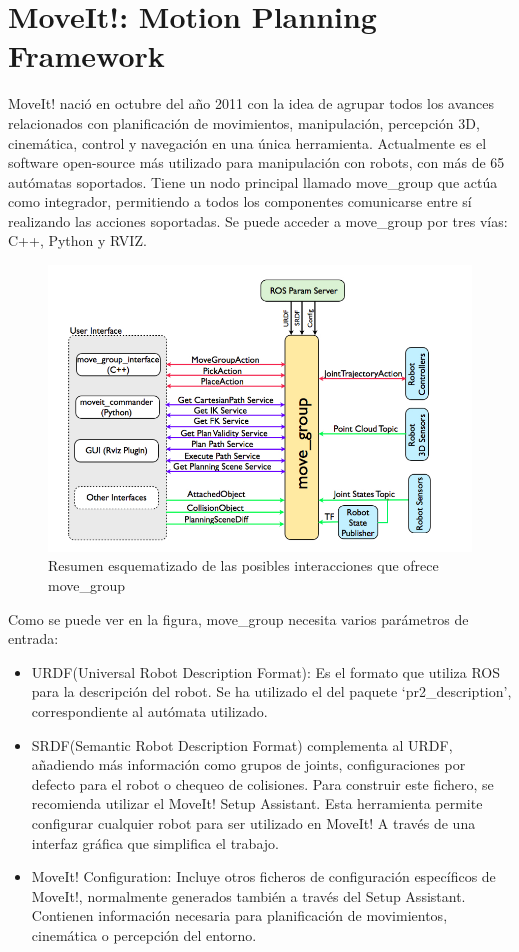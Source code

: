 \documentclass[12pt,spanish,chapterprefix, numbers=noenddot]{book}
\numberwithin{equation}{section}
\numberwithin{figure}{section}
\begin{document}
\section{MoveIt!: Motion Planning Framework}
MoveIt! nació en octubre del año 2011 con la idea de agrupar todos los avances relacionados con planificación de movimientos, manipulación, percepción 3D, cinemática, control y navegación en una única herramienta. Actualmente es el software open-source más utilizado para manipulación con robots, con más de 65 autómatas soportados. 
Tiene un nodo principal llamado move\_group que actúa como integrador, permitiendo a todos los componentes comunicarse entre sí realizando las acciones soportadas. 
Se puede acceder a move\_group por tres vías: C++, Python y RVIZ.
\begin{figure}[hbt!]
\centering
\includegraphics[width=12cm]{Figs/moveGroup.png}
\par
\caption{\label{fig:moveGroup}Resumen esquematizado de las posibles interacciones que ofrece move\_group}
\end{figure}
Como se puede ver en la figura, move\_group necesita varios parámetros de entrada:
\begin{itemize}
\item URDF(Universal Robot Description Format): Es el formato que utiliza ROS para la descripción del robot. Se ha utilizado el del paquete ‘pr2\_description’, correspondiente al autómata utilizado.
\item SRDF(Semantic Robot Description Format) complementa al URDF, añadiendo más información como grupos de joints, configuraciones por defecto para el robot o chequeo de colisiones. Para construir este fichero, se recomienda utilizar el MoveIt! Setup Assistant. Esta herramienta permite configurar cualquier robot para ser utilizado en MoveIt! A través de una interfaz gráfica que simplifica el trabajo. 
\item MoveIt! Configuration: Incluye otros ficheros de configuración específicos de MoveIt!, normalmente generados también a través del Setup Assistant. Contienen información necesaria para planificación de movimientos, cinemática o percepción del entorno.
\end{itemize}
\end{document}
